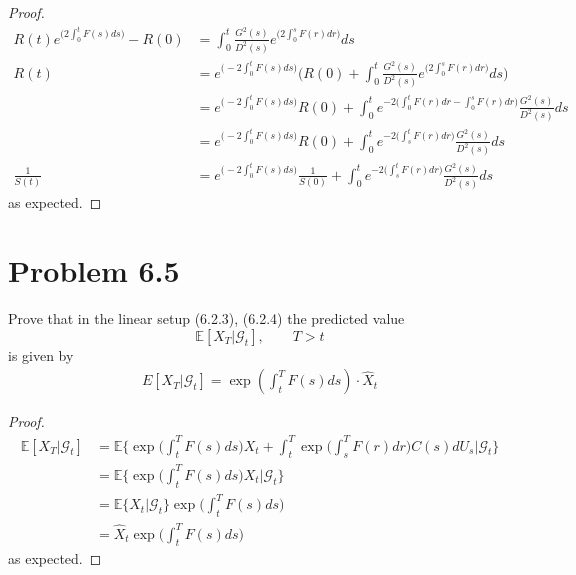 \documentclass[11pt]{article}
\newcommand{\gcal}{\mathcal{G}}
\newcommand{\E}{\mathbb{E}}
\begin{document}
\begin{enumerate}
\begin{proof}
\begin{align*}
R(t) e^{\big( 2 \int_0^t F(s) ds \big)} - R(0) &= \int_0^t \frac{G^2(s)}{D^2(s)} e^{\big( 2 \int_0^s F(r) dr \big)} ds\\
R(t) & = e^{\big( -2 \int_0^t F(s) ds \big)} \Bigg( R(0) + \int_0^t \frac{G^2(s)}{D^2(s)} e^{\big( 2 \int_0^s F(r) dr \big)} ds \Bigg)\\
&= e^{\big( -2 \int_0^t F(s) ds \big)} R(0) + \int_0^t e^{-2 \big(  \int_0^t F(r) dr - \int_0^s F(r) dr \big)} \frac{G^2(s)}{D^2(s)} ds \\
&= e^{\big( -2 \int_0^t F(s) ds \big)} R(0) + \int_0^t e^{-2 \big(  \int_s^t F(r) dr \big)} \frac{G^2(s)}{D^2(s)} ds \\
\frac{1}{S(t)}&= e^{\big( -2 \int_0^t F(s) ds \big)} \frac{1}{S(0)} + \int_0^t e^{-2 \big(  \int_s^t F(r) dr \big)} \frac{G^2(s)}{D^2(s)} ds 
\end{align*}
as expected.
\end{proof}
\end{enumerate}
\section*{Problem 6.5}
Prove that in the linear setup (6.2.3), (6.2.4) the predicted value
$$ \E[ X_T| \gcal_t], \qquad T > t$$
is given by 
\begin{align*}
E \left[ X _ { T } | \mathcal { G } _ { t } \right] = \exp \left( \int _ { t } ^ { T } F ( s ) d s \right) \cdot \widehat { X } _ { t }
\end{align*}
\begin{proof}
\begin{align*}
\E[X_T| \gcal_t] &= \E\Big\{  \exp \big(\int_t^T F(s) ds \big) X_t + \int_t^T \exp\big( \int_s^T F(r) dr \big) C(s) dU_s \Big| \gcal_t \Big\}\\
&= \E \Big\{ \exp \big( \int_t^T F(s) ds \big) X_t \Big| \gcal_t \Big\}\\
&=\E \{ X_t  | \gcal_t \} \exp \big( \int_t^T F(s) ds \big)\\
&= \hat{X}_t \exp \big( \int_t^T F(s) ds \big)
\end{align*}
as expected.
\end{proof}
\end{document}
